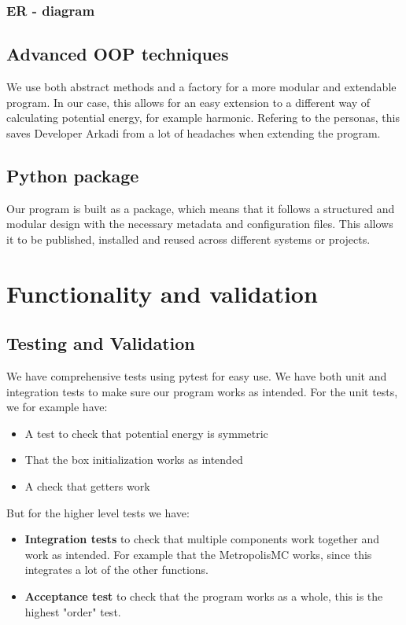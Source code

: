 \documentclass{article}
\begin{document}
\subsubsection*{ER - diagram}


\subsection*{Advanced OOP techniques}

We use both abstract methods and a factory for a more modular and extendable program. In our case, this allows for an easy extension to a different way of calculating potential energy, for example harmonic. Refering to the personas, this saves Developer Arkadi from a lot of headaches when extending the program.

\subsection*{Python package}

Our program is built as a package, which means that it follows a structured and modular design with the necessary metadata and configuration files. This allows it to be published, installed and reused across different systems or projects.

\section{Functionality and validation}

\subsection*{Testing and Validation}

We have comprehensive tests using pytest for easy use. We have both unit and integration tests to make sure our program works as intended. For the unit tests, we for example have:

\begin{itemize}
    \item A test to check that potential energy is symmetric
    \item That the box initialization works as intended
    \item A check that getters work
\end{itemize}

But for the higher level tests we have:

\begin{itemize}
    \item \textbf{Integration tests} to check that multiple components work together and work as intended. For example that the MetropolisMC works, since this integrates a lot of the other functions.
    \item \textbf{Acceptance test} to check that the program works as a whole, this is the highest "order" test.
\end{itemize}
\end{document}
